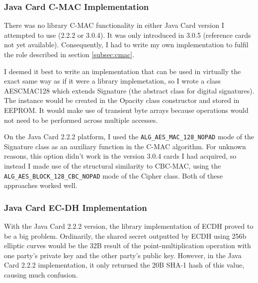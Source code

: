 \documentclass[12pt,a4paper]{article}
\begin{document}


\subsubsection{Java Card C-MAC Implementation}
\label{cmac_impl}


There was no library C-MAC functionality in either Java Card version I attempted to use (2.2.2 or 3.0.4). It was only introduced in 3.0.5 (reference cards not yet available). Consequently, I had to write my own implementation to fulfil the role described in section \ref{subsec:cmac}. 

I deemed it best to write an implementation that can be used in virtually the exact same way as if it were a library implemetation, so I wrote a class AESCMAC128 which extends Signature (the abstract class for digital signatures). The instance would be created in the Opacity class constructor and stored in EEPROM. It would make use of transient byte arrays because operations would not need to be performed across multiple accesses.

On the Java Card 2.2.2 platform, I used the \verb|ALG_AES_MAC_128_NOPAD| mode of the Signature class as an auxiliary function in the C-MAC algorithm. For unknown reasons, this option didn't work in the version 3.0.4 cards I had acquired, so instead I made use of the structural similarity to CBC-MAC, using the \verb|ALG_AES_BLOCK_128_CBC_NOPAD| mode of the Cipher class. Both of these approaches worked well.


\subsubsection{Java Card EC-DH Implementation}
With the Java Card 2.2.2 version, the library implementation of ECDH proved to be a big problem. Ordinarily, the shared secret outputted by ECDH using 256b elliptic curves would be the 32B result of the point-multiplication operation with one party's private key and the other party's public key. However, in the Java Card 2.2.2 implementation, it only returned the 20B SHA-1 hash of this value, causing much confusion.
\end{document}
